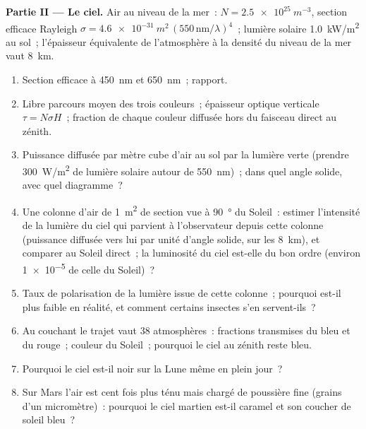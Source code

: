 \begin{problem}
\medskip
\noindent\textbf{Partie II --- Le ciel.}
Air au niveau de la mer~: $N = \qty{2.5e25}{m^{-3}}$, section efficace Rayleigh $\sigma =
\qty{4.6e-31}{m^2}\,(550\,\text{nm}/\lambda)^4$~; lumière solaire \qty{1.0}{kW/m^2} au
sol~; l'épaisseur équivalente de l'atmosphère à la densité du niveau de la mer vaut
\qty{8}{km}.
\begin{enumerate}[resume]
  \item Section efficace à \qty{450}{nm} et \qty{650}{nm}~; rapport.
  \item Libre parcours moyen des trois couleurs~; épaisseur optique verticale
        $\tau = N\sigma H$~; fraction de chaque couleur diffusée hors du
        faisceau direct au zénith.
  \item Puissance diffusée par mètre cube d'air au sol par la
        lumière verte (prendre \qty{300}{W/m^2} de lumière solaire autour de
        \qty{550}{nm})~; dans quel angle solide, avec quel diagramme~?
  \item Une colonne d'air de \qty{1}{m^2} de section vue à \qty{90}{\degree} du
        Soleil~: estimer l'intensité de la lumière du ciel qui parvient à
        l'observateur depuis cette colonne (puissance diffusée vers lui par
        unité d'angle solide, sur les \qty{8}{km}), et comparer au
        Soleil direct~; la luminosité du ciel est-elle du bon ordre
        (environ \qty{1e-5}{} de celle du Soleil)~?
  \item Taux de polarisation de la lumière issue de cette colonne~; pourquoi est-il
        plus faible en réalité, et comment certains insectes s'en servent-ils~?
  \item Au couchant le trajet vaut $38$ atmosphères~: fractions transmises
        du bleu et du rouge~; couleur du Soleil~; pourquoi le ciel au zénith reste
        bleu.
  \item Pourquoi le ciel est-il noir sur la Lune même en plein jour~?
  \item Sur Mars l'air est cent fois plus ténu mais chargé de poussière fine
        (grains d'un micromètre)~: pourquoi le ciel martien est-il
        caramel et son coucher de soleil bleu~?
\end{enumerate}


\end{problem}
